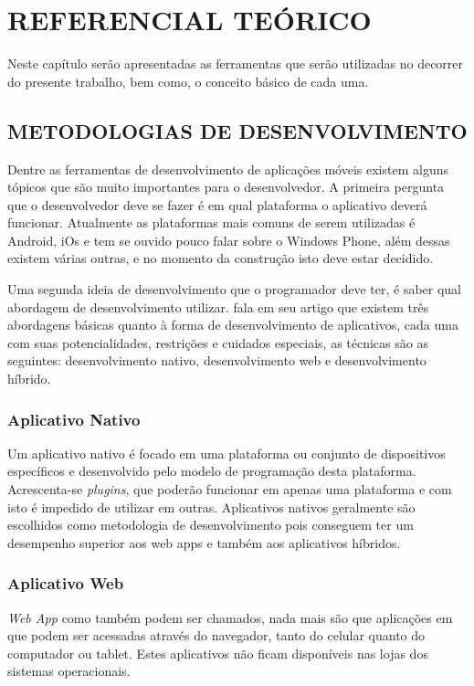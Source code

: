 
\chapter{REFERENCIAL TEÓRICO}
\label{chap:ref_teo}

Neste capítulo serão apresentadas as ferramentas que serão utilizadas no decorrer do presente trabalho, bem como, o conceito básico de cada uma. 

\section{METODOLOGIAS DE DESENVOLVIMENTO}

Dentre as ferramentas de desenvolvimento de aplicações móveis existem alguns tópicos que são muito importantes para o desenvolvedor. A primeira pergunta que o desenvolvedor deve se fazer é em qual plataforma o aplicativo deverá funcionar. Atualmente as plataformas mais comuns de serem utilizadas é Android, iOs e tem se ouvido pouco falar sobre o Windows Phone, além dessas existem várias outras, e no momento da construção isto deve estar decidido.

Uma segunda ideia de desenvolvimento que o programador deve ter, é saber qual abordagem de desenvolvimento utilizar. \cite{apps} fala em seu artigo que existem três abordagens básicas quanto à forma de desenvolvimento de aplicativos, cada uma com suas potencialidades, restrições e cuidados especiais, as técnicas são as seguintes: desenvolvimento nativo, desenvolvimento web e desenvolvimento híbrido.

\subsection{Aplicativo Nativo}
Um aplicativo nativo é focado em uma plataforma ou conjunto de dispositivos específicos e desenvolvido pelo modelo de programação desta plataforma. Acrescenta-se \textit{plugins}, que poderão funcionar em apenas uma plataforma e com isto é impedido de utilizar em outras. Aplicativos nativos geralmente são escolhidos como metodologia de desenvolvimento pois conseguem ter um desempenho superior aos web apps e também aos aplicativos híbridos.


\subsection{Aplicativo Web}
\textit{Web App} como também podem ser chamados, nada mais são que aplicações em que podem ser acessadas através do navegador, tanto do celular quanto do computador ou tablet. Estes aplicativos não ficam disponíveis nas lojas dos sistemas operacionais.


